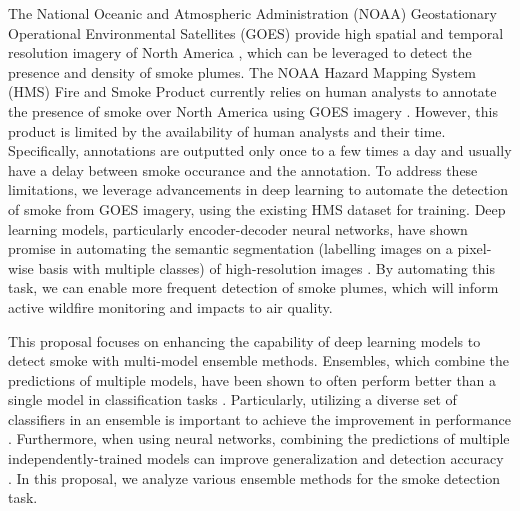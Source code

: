 \documentclass{article}
\begin{document}
The National Oceanic and Atmospheric Administration (NOAA) Geostationary Operational Environmental Satellites (GOES) provide high spatial and temporal resolution imagery of North America \citep{GOESbook}, which can be leveraged to detect the presence and density of smoke plumes. The NOAA Hazard Mapping System (HMS) Fire and Smoke Product currently relies on human analysts to annotate the presence of smoke over North America using GOES imagery \citep{hms}. However, this product is limited by the availability of human analysts and their time. Specifically, annotations are outputted only once to a few times a day and usually have a delay between smoke occurance and the annotation. To address these limitations, we leverage advancements in deep learning to automate the detection of smoke from GOES imagery, using the existing HMS dataset for training. Deep learning models, particularly encoder-decoder neural networks, have shown promise in automating the semantic segmentation (labelling images on a pixel-wise basis with multiple classes) of high-resolution images \citep{cv-segmentation-review}. By automating this task, we can enable more frequent detection of smoke plumes, which will inform active wildfire monitoring and impacts to air quality.

This proposal focuses on enhancing the capability of deep learning models to detect smoke with multi-model ensemble methods. Ensembles, which combine the predictions of multiple models, have been shown to often perform better than a single model in classification tasks \citep{ensemble-ml}. Particularly, utilizing a diverse set of classifiers in an ensemble is important to achieve the improvement in performance \citep{ensemble-diversity}. Furthermore, when using neural networks, combining the predictions of multiple independently-trained models can improve generalization and detection accuracy \citep{nn-ensemble,nn-ensemble2, nn-error-ens}. In this proposal, we analyze various ensemble methods for the smoke detection task.

\end{document}
